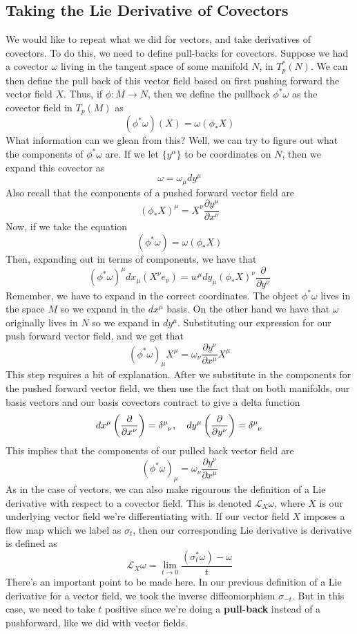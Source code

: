 \subsection{Taking the Lie Derivative of Covectors} 
We would like to repeat what we did for vectors, and take derivatives of covectors. 
To do this, we need to define pull-backs for covectors.
Suppose we had a covector $\omega$ living in the tangent space 
of some manifold $N$, in $T_p^*( N)$. 
We can then define the pull back of this vector field based on first pushing forward 
the vector field $X$. Thus, if $\phi : M \to  N$, then we define the pullback 
$\phi^ * \omega $ as the covector field in $T_p ( M ) $ as 
\[
( \phi^* \omega ) ( X)  = \omega ( \phi_* X ) 
\] What information can we glean from this? 
Well, we can try to figure out what the components of $\phi^ * \omega $ are. 
If we let $\{ y ^ \alpha \} $ to be coordinates on $N$, 
then we expand this covector as 
\[
\omega = \omega_\mu  dy^\mu  
\] Also recall that the components of a pushed forward vector field are 
\[
( \phi_* X )^ \mu   = X^\nu \frac{\partial y ^ \mu  }{ \partial x^\nu }
\] Now, if we take the equation 
\[
( \phi ^ * \omega )  = \omega ( \phi_* X ) 
\] Then, expanding out in terms of components, we have that 
\[
( \phi^* \omega ) ^\mu  dx_\mu  ( X^\nu  e_\nu  )  = w^\mu  dy_\mu  ( \phi_* X)^\nu  \frac{\partial }{\partial y ^\nu  }
\] Remember, we have to expand in the correct coordinates. The object $ \phi^* \omega $ lives in 
the space $M $ so we expand in the $ dx^ \mu  $ basis. On the other hand
we have that $\omega $ originally lives in $N $ so we expand in 
$ dy^ \mu  $. 
Substituting our expression for our push forward vector field, 
and we get that 
\[
( \phi^ * \omega )_\mu  X^\mu  = \omega_\nu  \frac{\partial y^\nu  }{\partial x^\mu }X^\mu  
\] This step requires a bit of explanation. 
After we substitute in the components for the pushed forward vector field, 
we then use the fact that on both manifolds, our basis vectors and 
our basis covectors contract to give a delta function 
\[
dx^\mu  \left(  \frac{\partial }{\partial x^ \nu } \right)= \delta \indices{^\mu  _\nu }, \quad dy^\mu  \left( \frac{\partial }{\partial y^\nu  }  \right) = \delta \indices{^\mu _\nu }						  
\] This implies that the components of our pulled back vector field are 
\[
( \phi^* \omega )_\mu  = \omega_\nu  \frac{\partial y^\nu }{\partial x^\mu  }
\] 
As in the case of vectors, we can also make rigourous the definition of a Lie derivative 
with respect to a covector field. 
This is denoted $\mathcal{L}_X \omega$, where $X$ is our underlying vector field
we're differentiating with. 
If our vector field $X$ imposes a flow map which we label as 
$\sigma_ t$, then our corresponding Lie derivative is derivative is defined as 
\[
\mathcal{ L }_X \omega  =\lim_{t \to 0} \frac{( \sigma_t^* \omega)   - \omega }{t }	 
\]There's an important point to be made here. 
In our previous definition of a Lie derivative for a vector field, 
we took the inverse diffeomorphism $\sigma_{ - t} $. 
But in this case, we need to take $t $ positive since 
we're doing a \textbf{pull-back} instead of a pushforward, like we did 
with vector fields. 

